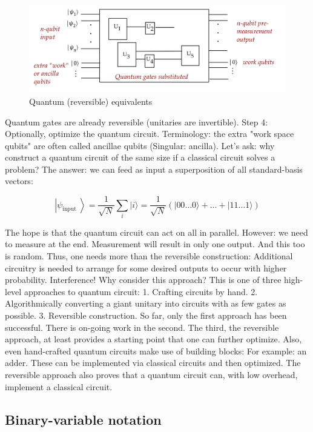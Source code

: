 \documentclass[main.tex]{subfiles}
\begin{document}
    \begin{figure}
        \centering
        \includegraphics[width=5in]{notes/figs/n10/03reversible3.png}
        \caption{Quantum (reversible) equivalents}
        \label{fig:03reversible3}
    \end{figure}
    
    Quantum gates are already reversible (unitaries are invertible). Step 4: Optionally, optimize the quantum circuit. Terminology: the extra "work space qubits" are often called ancillae qubits (Singular: ancilla). Let's ask: why construct a quantum circuit of the same size if a classical circuit solves a problem? The answer: we can feed as input a superposition of all standard-basis vectors:
    
    $$
    \left|\psi_{\text {input }}\right\rangle=\frac{1}{\sqrt{N}} \sum_{i}|i\rangle=\frac{1}{\sqrt{N}}(|00 \ldots 0\rangle+\ldots+|11 \ldots 1\rangle)
    $$
    
    The hope is that the quantum circuit can act on all in parallel. However: we need to measure at the end. Measurement will result in only one output. And this too is random. Thus, one needs more than the reversible construction: Additional circuitry is needed to arrange for some desired outputs to occur with higher probability. Interference! Why consider this approach? This is one of three high-level approaches to quantum circuit: 1. Crafting circuits by hand. 2. Algorithmically converting a giant unitary into circuits with as few gates as possible. 3. Reversible construction. So far, only the first approach has been successful. There is on-going work in the second. The third, the reversible approach, at least provides a starting point that one can further optimize. Also, even hand-crafted quantum circuits make use of building blocks: For example: an adder. These can be implemented via classical circuits and then optimized. The reversible approach also proves that a quantum circuit can, with low overhead, implement a classical circuit.
    
\subsection{Binary-variable notation}
\end{document}
